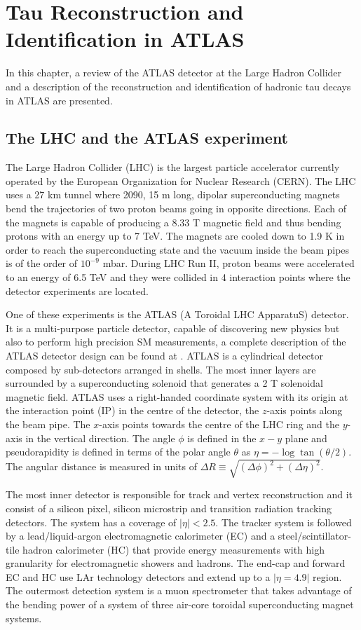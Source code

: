 \chapter{Tau Reconstruction and Identification in ATLAS}\label{ATLAS}
In this chapter, a review of the ATLAS detector at the Large Hadron Collider and a description of the reconstruction and identification of hadronic tau decays in ATLAS are presented.
\section{The LHC and the ATLAS experiment}
The Large Hadron Collider (LHC) is the largest particle accelerator currently operated by the European Organization for Nuclear Research (CERN). The LHC uses a 27 km tunnel where 2090, 15 m long, dipolar superconducting magnets bend the trajectories of two proton beams going in opposite directions. Each of the magnets is capable of producing a 8.33 T magnetic field and thus bending protons with an energy up to 7 TeV. The magnets are cooled down to 1.9 K in order to reach the superconducting state and the vacuum inside the beam pipes is of the order of $10^{-9}$ mbar. During LHC Run II, proton beams were accelerated to an energy of 6.5 TeV and they were collided in 4 interaction points where the detector experiments are located.

One of these experiments is the ATLAS (A Toroidal LHC ApparatuS) detector. It is a multi-purpose particle detector, capable of discovering new physics but also to perform high precision SM measurements, a complete description of the ATLAS detector design can be found at \cite{ATLAS:1999uwa}. ATLAS is a cylindrical detector composed by sub-detectors arranged in shells. The most inner layers are surrounded by a superconducting solenoid that generates a 2 T solenoidal magnetic field. ATLAS uses a right-handed coordinate system with its origin at the interaction point (IP) in the centre of the detector, the $z$-axis points along the beam pipe. The $x$-axis points towards the centre of the LHC ring and the $y$-axis in the vertical direction. The angle $\phi$ is defined in the $x-y$ plane and pseudorapidity is defined in terms of the polar angle $\theta$ as $\eta=-\log \tan(\theta/2)$. The angular distance is measured in units of $\Delta R\equiv \sqrt{(\Delta\phi)^2+(\Delta\eta)^2}$.

The most inner detector is responsible for track and vertex reconstruction and it consist of a silicon pixel, silicon microstrip and transition radiation tracking detectors. The system has a coverage of $|\eta|<2.5$. The tracker system is followed by a lead/liquid-argon electromagnetic calorimeter (EC) and a steel/scintillator-tile hadron calorimeter (HC) that provide energy measurements with high granularity for electromagnetic showers and hadrons. The end-cap and forward EC and HC use LAr technology detectors and extend up to a $|\eta=4.9|$ region. The outermost detection system is a muon spectrometer that takes advantage of the bending power of a system of three air-core toroidal superconducting magnet systems.
  
